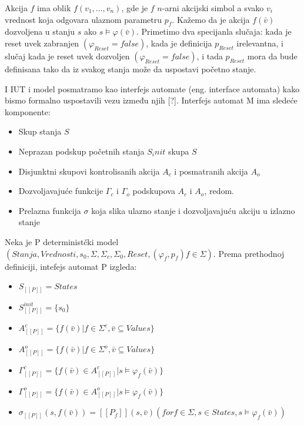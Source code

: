 \documentclass[a4paper]{article}
\theoremstyle{definition}
\begin{document}
{Akcija $f$ ima oblik $f(v_1,...,v_n)$, gde je $f$ $n$-arni akcijski simbol a svako $v_i$ vrednost koja odgovara ulaznom parametru $p_f$. Kažemo da je akcija $f(\bar{v})$ dozvoljena u stanju $s$ ako $s \models \varphi(\bar{v})$. Primetimo dva specijanla slučaja: kada je reset uvek zabranjen $(\varphi_{Reset} = false)$, kada je definicija $p_{Reset}$ irelevantna, i slučaj kada je reset uvek dozvoljen $(\varphi_{Reset} = false)$, i tada $p_{Reset}$ mora da bude definisana tako da iz svakog stanja može da uspostavi početno stanje.

I IUT i model posmatramo kao interfejs automate (eng. interface automata) kako bismo formalno uspostavili vezu između njih [?]. %
Interfejs automat M ima sledeće komponente:
\begin{itemize}
\item Skup stanja $S$
\item Neprazan podskup početnih stanja $S_init$ skupa $S$
\item Disjunktni skupovi kontrolisanih akcija $A_c$ i posmatranih akcija $A_o$
\item Dozvoljavajuće funkcije $\Gamma_c$ i $\Gamma_o$ podskupova $A_c$ i $A_o$, redom.
\item Prelazna funkcija $\sigma$ koja slika ulazno stanje i dozvoljavajuću akciju u izlazno stanje
\end{itemize}

Neka je P deterministčki model $(Stanja, Vrednosti, s_0, \Sigma, \Sigma_c, \Sigma_0, Reset, (\varphi_f, p_f)f \in \Sigma)$. Prema prethodnoj definiciji, intefejs automat P izgleda:

\begin{itemize}
\item $S_{[[P]]} = States$
\item $S^{init}_{[[P]]} = \{s_0\}$
\item $A^c_{[[P]]} = \{ f(\bar{v}) | f \in \Sigma^c, \bar{v} \subseteq Values \}$ 
\item $A^o_{[[P]]} = \{ f(\bar{v}) | f \in \Sigma^o, \bar{v} \subseteq Values \}$
\item $\Gamma^c_{[[P]]} = \{ f(\bar{v}) \in A^c_{[[P]]} | s \models \varphi_f(\bar{v}) \}$ 
\item $\Gamma^o_{[[P]]} = \{ f(\bar{v}) \in A^o_{[[P]]} | s \models \varphi_f(\bar{v}) \}$
\item $\sigma_{[[P]]}(s, f(\bar{v})) = [[P_f]](s, \bar{v}) (for f \in \Sigma, s \in States, s \models \varphi_f(\bar{v}))$
\end{itemize}

}
\end{document}
